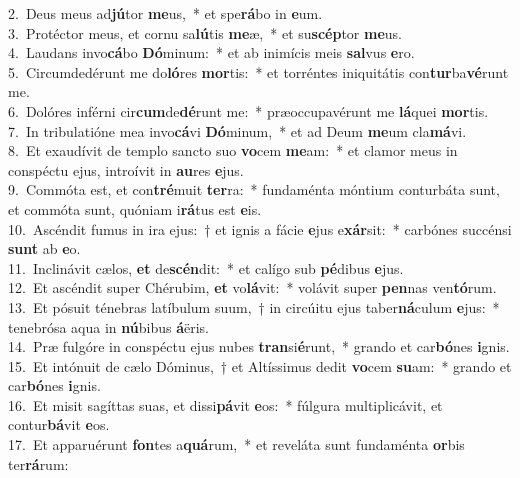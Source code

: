 {2.~}Deus meus ad\textbf{jú}tor \textbf{me}us,~* et spe\textbf{rá}bo in \textbf{e}um.\\
{3.~}Protéctor meus, et cornu sa\textbf{lú}tis \textbf{me}æ,~* et su\textbf{scép}tor \textbf{me}us.\\
{4.~}Laudans invo\textbf{cá}bo \textbf{Dó}minum:~* et ab inimícis meis \textbf{sal}vus \textbf{e}ro.\\
{5.~}Circumdedérunt me do\textbf{ló}res \textbf{mor}tis:~* et torréntes iniquitátis con\textbf{tur}ba\textbf{vé}runt me.\\
{6.~}Dolóres inférni cir\textbf{cum}de\textbf{dé}runt me:~* præoccupavérunt me \textbf{lá}quei \textbf{mor}tis.\\
{7.~}In tribulatióne mea invo\textbf{cá}vi \textbf{Dó}minum,~* et ad Deum \textbf{me}um cla\textbf{má}vi.\\
{8.~}Et exaudívit de templo sancto suo \textbf{vo}cem \textbf{me}am:~* et clamor meus in conspéctu ejus, introívit in \textbf{au}res \textbf{e}jus.\\
{9.~}Commóta est, et con\textbf{tré}muit \textbf{ter}ra:~* fundaménta móntium conturbáta sunt, et commóta sunt, quóniam i\textbf{rá}tus est \textbf{e}is.\\
{10.~}Ascéndit fumus in ira ejus:~† et ignis a fácie \textbf{e}jus e\textbf{xár}sit:~* carbónes succénsi \textbf{sunt} ab \textbf{e}o.\\
{11.~}Inclinávit cælos, \textbf{et} de\textbf{scén}dit:~* et calígo sub \textbf{pé}dibus \textbf{e}jus.\\
{12.~}Et ascéndit super Chérubim, \textbf{et} vo\textbf{lá}vit:~* volávit super \textbf{pen}nas ven\textbf{tó}rum.\\
{13.~}Et pósuit ténebras latíbulum suum,~† in circúitu ejus taber\textbf{ná}culum \textbf{e}jus:~* tenebrósa aqua in \textbf{nú}bibus \textbf{á}ëris.\\
{14.~}Præ fulgóre in conspéctu ejus nubes \textbf{tran}si\textbf{é}runt,~* grando et car\textbf{bó}nes \textbf{i}gnis.\\
{15.~}Et intónuit de cælo Dóminus,~† et Altíssimus dedit \textbf{vo}cem \textbf{su}am:~* grando et car\textbf{bó}nes \textbf{i}gnis.\\
{16.~}Et misit sagíttas suas, et dissi\textbf{pá}vit \textbf{e}os:~* fúlgura multiplicávit, et contur\textbf{bá}vit \textbf{e}os.\\
{17.~}Et apparuérunt \textbf{fon}tes a\textbf{quá}rum,~* et reveláta sunt fundaménta \textbf{or}bis ter\textbf{rá}rum:\\
